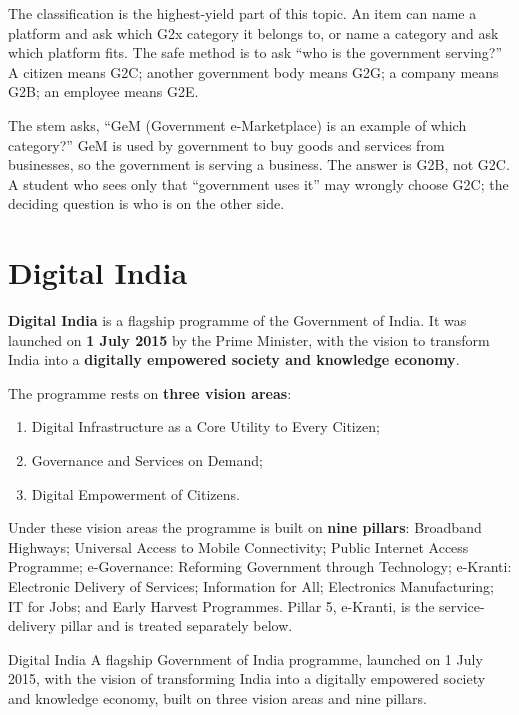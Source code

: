 The classification is the highest-yield part of this topic. An item can
name a platform and ask which G2x category it belongs to, or name a category
and ask which platform fits. The safe method is to ask ``who is the
government serving?'' A citizen means G2C; another government body means
G2G; a company means G2B; an employee means G2E.

\begin{example}
The stem asks, ``GeM (Government e-Marketplace) is an example of which
category?'' GeM is used by government to buy goods and services from
businesses, so the government is serving a business. The answer is G2B, not
G2C. A student who sees only that ``government uses it'' may wrongly choose
G2C; the deciding question is who is on the other side.
\end{example}

\section{Digital India}
\textbf{Digital India} is a flagship programme of the Government of India.
It was launched on \textbf{1 July 2015} by the Prime Minister, with the
vision to transform India into a \textbf{digitally empowered society and
knowledge economy}.

The programme rests on \textbf{three vision areas}:
\begin{enumerate}[label=(\roman*)]
  \item Digital Infrastructure as a Core Utility to Every Citizen;
  \item Governance and Services on Demand;
  \item Digital Empowerment of Citizens.
\end{enumerate}

Under these vision areas the programme is built on \textbf{nine pillars}:
Broadband Highways; Universal Access to Mobile Connectivity; Public Internet
Access Programme; e-Governance: Reforming Government through Technology;
e-Kranti: Electronic Delivery of Services; Information for All; Electronics
Manufacturing; IT for Jobs; and Early Harvest Programmes. Pillar 5,
e-Kranti, is the service-delivery pillar and is treated separately below.

\begin{definitionbox}{Digital India}
A flagship Government of India programme, launched on 1 July 2015, with the
vision of transforming India into a digitally empowered society and
knowledge economy, built on three vision areas and nine pillars.
\end{definitionbox}

